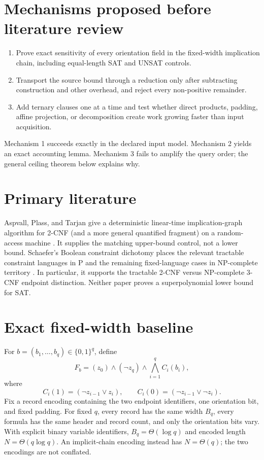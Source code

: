 \documentclass[11pt]{article}
\begin{document}
\section*{Mechanisms proposed before literature review}
\begin{enumerate}
\item Prove exact sensitivity of every orientation field in the fixed-width
implication chain, including equal-length SAT and UNSAT controls.
\item Transport the source bound through a reduction only after subtracting
construction and other overhead, and reject every non-positive remainder.
\item Add ternary clauses one at a time and test whether direct products,
padding, affine projection, or decomposition create work growing faster than
input acquisition.
\end{enumerate}
Mechanism 1 succeeds exactly in the declared input model.  Mechanism 2 yields
an exact accounting lemma.  Mechanism 3 fails to amplify the query order; the
general ceiling theorem below explains why.

\section*{Primary literature}
Aspvall, Plass, and Tarjan give a deterministic linear-time implication-graph
algorithm for 2-CNF (and a more general quantified fragment) on a random-access
machine \cite{APT79}.  It supplies the matching upper-bound control, not a lower
bound.  Schaefer's Boolean constraint dichotomy places the relevant tractable
constraint languages in P and the remaining fixed-language cases in
NP-complete territory \cite{Schaefer78}.  In particular, it supports the
tractable 2-CNF versus NP-complete 3-CNF endpoint distinction.  Neither paper
proves a superpolynomial lower bound for SAT.

\section*{Exact fixed-width baseline}
For $b=(b_1,\ldots,b_q)\in\{0,1\}^q$, define
\[
 F_b=(z_0)\wedge(\neg z_q)\wedge\bigwedge_{i=1}^q C_i(b_i),
\]
where
\[
 C_i(1)=(\neg z_{i-1}\vee z_i),\qquad
 C_i(0)=(\neg z_{i-1}\vee\neg z_i).
\]
Fix a record encoding containing the two endpoint identifiers, one orientation
bit, and fixed padding.  For fixed $q$, every record has the same width
$B_q$, every formula has the same header and record count, and only the
orientation bits vary.  With explicit binary variable identifiers,
$B_q=\Theta(\log q)$ and encoded length $N=\Theta(q\log q)$.  An implicit-chain
encoding instead has $N=\Theta(q)$; the two encodings are not conflated.
\end{document}
